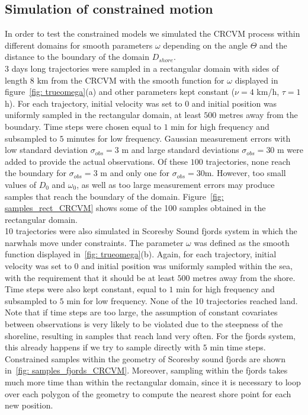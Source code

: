 \documentclass[11pt]{article}
\newcommand {\1}{\mathbb{1}}
\begin{document}
\label{section: simulation study}




\subsection{Simulation of constrained motion}
In order to test the constrained models we simulated the CRCVM process within different domains for smooth parameters $\omega$ depending on the angle $\Theta$ and the distance to the boundary of the domain $D_{shore}$.\\


$3$ days long trajectories were sampled in a rectangular domain with sides of length $8$ km from the CRCVM with the smooth function for $\omega$ displayed in figure~\ref{fig: trueomega}(a) and other parameters kept constant ($\nu = 4$ km/h, $\tau=1$ h). For each trajectory, initial velocity was set to $0$ and initial position was uniformly sampled in the rectangular domain, at least $500$ metres away from the boundary. Time steps were chosen equal to $1$ min for high frequency and subsampled to $5$ minutes for low frequency. Gaussian measurement errors with low standard deviation $\sigma_{obs}=3$ m and large standard deviations $\sigma_{obs}=30$ m were added to provide the actual observations. Of these $100$ trajectories, none reach the boundary for $\sigma_{obs}=3$ m and only one for $\sigma_{obs}=30$m. However, too small values of $D_0$ and $\omega_0$, as well as too large measurement errors may produce samples that reach the boundary of the domain. Figure~\ref{fig: samples_rect_CRCVM} shows some of the 100 samples obtained in the rectangular domain. \\


10 trajectories were also simulated in Scoresby Sound fjords system in which the narwhals move under constraints. The parameter $\omega$ was defined as the smooth function displayed in~\ref{fig: trueomega}(b). Again, for each trajectory, initial velocity was set to $0$ and initial position was uniformly sampled within the sea, with the requirement that it should be at least $500$ metres away from the shore. Time steps were also kept constant, equal to $1$ min for high frequency and subsampled to $5$ min for low frequency. None of the 10 trajectories reached land. Note that if time steps are too large, the assumption of constant covariates between observations is very likely to be violated due to the steepness of the shoreline, resulting in samples that reach land very often. For the fjords system, this already happens if we try to sample directly with $5$ min time steps. Constrained samples within the geometry of Scoresby sound fjords are shown in~\ref{fig: samples_fjords_CRCVM}. Moreover, sampling within the fjords takes much more time than within the rectangular domain, since it is necessary to loop over each polygon of the geometry to compute the nearest shore point for each new position. 
\end{document}
